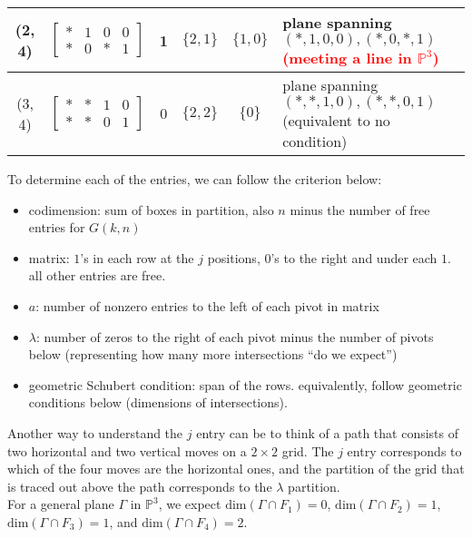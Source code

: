 \begin{itemize}
\begin{enumerate}[a)]
\begin{tabular}{c | c | c | c | c | L}
        (2, 4) & $\begin{bmatrix}
        \ast & 1 & 0 & 0 \\
        \ast & 0 & \ast & 1
        \end{bmatrix}$ & 1 & $\{2, 1\}$ & $\{1, 0\}$ & plane spanning $(\ast, 1, 0, 0), (\ast, 0, \ast, 1)$ \textcolor{red}{\textbf{(meeting a line in $\mathbb{P}^3$)}} \\ \hline \rule{0pt}{4ex}    

        (3, 4) & $\begin{bmatrix}
        \ast & \ast & 1 & 0 \\
        \ast & \ast & 0 & 1
        \end{bmatrix}$ & 0 & $\{2, 2\}$ & $\{0\}$ & plane spanning $(\ast, \ast, 1, 0), (\ast, \ast, 0, 1)$ 
        (equivalent to no condition)

        \end{tabular}

        To determine each of the entries, we can follow the criterion below:
        \begin{itemize}
            \item codimension: sum of boxes in partition, also $n$ minus the number of free entries for $G(k, n)$
            \item matrix: $1$'s in each row at the $j$ positions, $0$'s to the right and under each $1$. all other entries are free.
            \item $a$: number of nonzero entries to the left of each pivot in matrix
            \item $\lambda$: number of zeros to the right of each pivot minus the number of pivots below (representing how many more intersections ``do we expect'')
            \item geometric Schubert condition: span of the rows. equivalently, follow geometric conditions below (dimensions of intersections).
        \end{itemize}
        Another way to understand the $j$ entry can be to think of a path that consists of two horizontal and two vertical moves on a $2 \times 2$ grid. The $j$ entry corresponds to which of the four moves are the horizontal ones, and the partition of the grid that is traced out above the path corresponds to the $\lambda$ partition. \\

        For a general plane $\Gamma$ in $\mathbb{P}^3$, we expect $\mathrm{dim} (\Gamma \cap F_1) = 0$, $\mathrm{dim} (\Gamma \cap F_2) = 1$, $\mathrm{dim} (\Gamma \cap F_3) = 1$, and $\mathrm{dim} (\Gamma \cap F_4) = 2$. \\


\end{enumerate}
\end{itemize}
